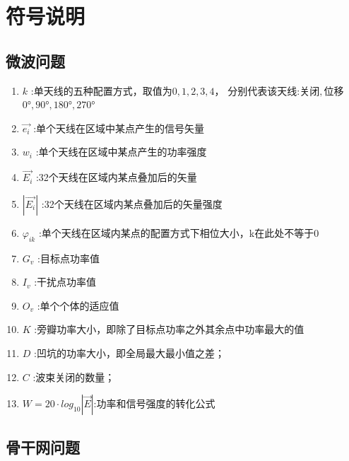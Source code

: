 \documentclass[UTF8,12pt]{ctexart}
\begin{document}
\section{符号说明}
    \subsection{微波问题}
        \begin{enumerate}
            \item $k$ :单天线的五种配置方式，取值为$0,1,2,3,4$，
            分别代表该天线:关闭$,$位移$0°,90°,180°,270°$
            \item $\overrightarrow{e_i}$ :单个天线在区域中某点产生的信号矢量
            \item $w_i$ :单个天线在区域中某点产生的功率强度
            \item $\overrightarrow{E_i}$ :32个天线在区域内某点叠加后的矢量
            \item $|\overrightarrow{E_i}|$ :32个天线在区域内某点叠加后的矢量强度
            \item $\varphi_{ik}$ :单个天线在区域内某点的配置方式下相位大小，k在此处不等于0
            \item $G_v$ :目标点功率值
            \item $I_v$ :干扰点功率值
            \item $O_v$ :单个个体的适应值
            \item $K$ :旁瓣功率大小，即除了目标点功率之外其余点中功率最大的值
            \item $D$ :凹坑的功率大小，即全局最大最小值之差；
            \item $C$ :波束关闭的数量；
            \item $W = 20\cdot log_{10}{|\overrightarrow{E}|}$:功率和信号强度的转化公式
        
       
        \end{enumerate}
    
    \subsection{骨干网问题}
\end{document}
